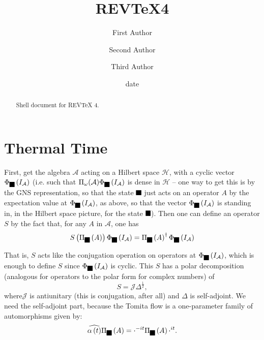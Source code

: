 \documentclass[aps,preprint]{revtex4}%
\providecommand{\U}[1]{\protect\rule{.1in}{.1in}}
\begin{document}
\title[Short title for running header]{REV\TeX4}
\author{First Author}
\author{Second Author}
\author{Third Author}

\begin{abstract}
Shell document for REV\TeX{} 4.

\end{abstract}
\date[Date text]{date}




\maketitle
\tableofcontents


\section{Thermal Time}

First, get the algebra $\mathcal{A}$ acting on a Hilbert space $\mathcal{H}$,
with a cyclic vector $\Phi_{\U{3c9} }\left(  I_{\mathcal{A}}\right)  $ (i.e.
such that $\Pi_{\omega}(\mathcal{A})\Phi_{\U{3c9} }\left(  I_{\mathcal{A}%
}\right)  $ is dense in $\mathcal{H}$ -- one way to get this is by the GNS
representation, so that the state $\U{3c9} $ just acts on an operator $A$ by
the expectation value at $\Phi_{\U{3c9} }\left(  I_{\mathcal{A}}\right)  $, as
above, so that the vector $\Phi_{\U{3c9} }\left(  I_{\mathcal{A}}\right)  $ is
standing in, in the Hilbert space picture, for the state $\U{3c9} $). Then one
can define an operator $S$ by the fact that, for any $A$ in $\mathcal{A}$, one
has%
\begin{equation}
S\left(  \Pi_{\U{3c9} }\left(  A\right)  \right)  \Phi_{\U{3c9} }\left(
I_{\mathcal{A}}\right)  =\Pi_{\U{3c9} }\left(  A\right)  ^{\dagger}%
\Phi_{\U{3c9} }\left(  I_{\mathcal{A}}\right)
\end{equation}


That is, $S$ acts like the conjugation operation on operators at
$\Phi_{\U{3c9} }\left(  I_{\mathcal{A}}\right)  $, which is enough to define
$S$ since $\Phi_{\U{3c9} }\left(  I_{\mathcal{A}}\right)  $ is cyclic. This
$S$ has a polar decomposition (analogous for operators to the polar form for
complex numbers) of
\begin{equation}
S=\mathcal{J\Delta}^{\frac{1}{2}},
\end{equation}
where$\mathcal{J}$ is antiunitary (this is conjugation, after all) and
$\mathcal{\Delta}$ is self-adjoint. We need the self-adjoint part, because the
Tomita flow is a one-parameter family of automorphisms given by:%
\begin{equation}
\widehat{\alpha\left(  t\right)  }\Pi_{\U{3c9} }\left(  A\right)
=\mathcal{\Delta}^{-it}\Pi_{\U{3c9} }\left(  A\right)  \mathcal{\Delta}^{it}.
\end{equation}
\end{document}
